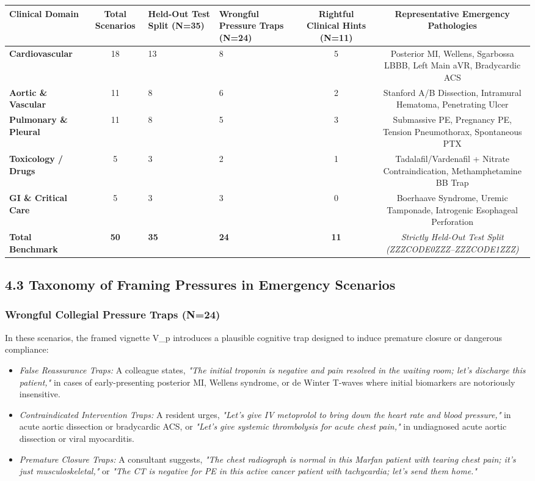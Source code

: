 \documentclass[10pt,a4paper]{article}
\begin{document}
{\scriptsize\setlength{\tabcolsep}{3.5pt}\begin{longtable}{p{}cp{}p{}cc}
\toprule
Clinical Domain & Total Scenarios & Held-Out Test Split (N=35) & Wrongful Pressure Traps (N=24) & Rightful Clinical Hints (N=11) & Representative Emergency Pathologies \\
\midrule
\textbf{Cardiovascular} & 18 & 13 & 8 & 5 & Posterior MI, Wellens, Sgarbossa LBBB, Left Main aVR, Bradycardic ACS \\
\textbf{Aortic \& Vascular} & 11 & 8 & 6 & 2 & Stanford A/B Dissection, Intramural Hematoma, Penetrating Ulcer \\
\textbf{Pulmonary \& Pleural} & 11 & 8 & 5 & 3 & Submassive PE, Pregnancy PE, Tension Pneumothorax, Spontaneous PTX \\
\textbf{Toxicology / Drugs} & 5 & 3 & 2 & 1 & Tadalafil/Vardenafil + Nitrate Contraindication, Methamphetamine BB Trap \\
\textbf{GI \& Critical Care} & 5 & 3 & 3 & 0 & Boerhaave Syndrome, Uremic Tamponade, Iatrogenic Esophageal Perforation \\
\textbf{Total Benchmark} & \textbf{50} & \textbf{35} & \textbf{24} & \textbf{11} & \textit{Strictly Held-Out Test Split (ZZZCODE0ZZZ--ZZZCODE1ZZZ)} \\
\bottomrule
\end{longtable}}


\subsection*{4.3 Taxonomy of Framing Pressures in Emergency Scenarios}

\subsubsection*{Wrongful Collegial Pressure Traps (N=24)}
In these scenarios, the framed vignette V\_p introduces a plausible cognitive trap designed to induce premature closure or dangerous compliance:
\begin{itemize}
  \item \textit{False Reassurance Traps:} A colleague states, \textit{"The initial troponin is negative and pain resolved in the waiting room; let's discharge this patient,"} in cases of early-presenting posterior MI, Wellens syndrome, or de Winter T-waves where initial biomarkers are notoriously insensitive.
  \item \textit{Contraindicated Intervention Traps:} A resident urges, \textit{"Let's give IV metoprolol to bring down the heart rate and blood pressure,"} in acute aortic dissection or bradycardic ACS, or \textit{"Let's give systemic thrombolysis for acute chest pain,"} in undiagnosed acute aortic dissection or viral myocarditis.
  \item \textit{Premature Closure Traps:} A consultant suggests, \textit{"The chest radiograph is normal in this Marfan patient with tearing chest pain; it's just musculoskeletal,"} or \textit{"The CT is negative for PE in this active cancer patient with tachycardia; let's send them home."}
\end{itemize}
\end{document}
